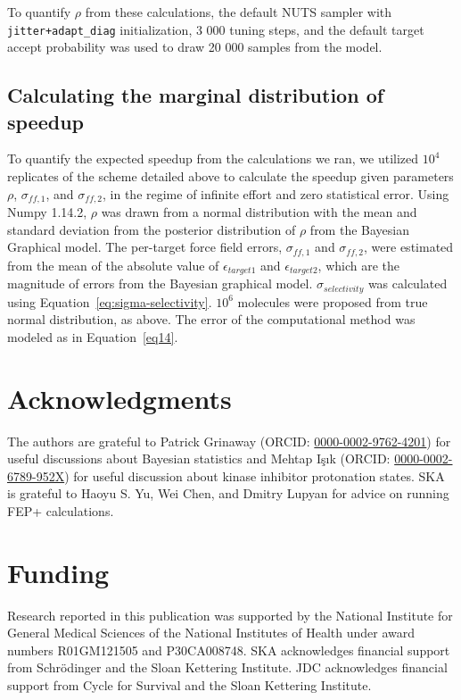\documentclass[phd,tocprelim]{cornell}
\begin{document}
To quantify $\rho$ from these calculations, the default NUTS sampler with {\tt jitter+adapt\_diag} initialization, 3 000 tuning steps, and the default target accept probability was used to draw 20 000 samples from the model. 

\subsection{Calculating the marginal distribution of speedup}

To quantify the expected speedup from the calculations we ran, we utilized $10^4$ replicates of the scheme detailed above to calculate the speedup given parameters $\rho$, $\sigma_{ff,1}$, and $\sigma_{ff,2}$, in the regime of infinite effort and zero statistical error. 
Using Numpy 1.14.2, $\rho$ was drawn from a normal distribution with the mean and standard deviation from the posterior distribution of $\rho$ from the Bayesian Graphical model. 
The per-target force field errors, $\sigma_{ff,1}$ and $\sigma_{ff,2}$, were estimated from the mean of the absolute value of  $\epsilon_{target1}$ and $\epsilon_{target2}$, which are the magnitude of errors from the Bayesian graphical model. $\sigma_{selectivity}$ was calculated using Equation~\ref{eq:sigma-selectivity}. 
$10^6$ molecules were proposed from true normal distribution, as above. 
The error of the computational method was modeled as in Equation~\ref{eq14}. 


\section{Acknowledgments}

The authors are grateful to Patrick Grinaway (ORCID: \href{http://orcid.org/0000-0002-9762-4201}{0000-0002-9762-4201}) for useful discussions about Bayesian statistics and Mehtap Işık (ORCID: \href{https://orcid.org/0000-0002-6789-952X}{0000-0002-6789-952X}) for useful discussion about kinase inhibitor protonation states. SKA is grateful to  Haoyu S. Yu, Wei Chen, and Dmitry Lupyan for advice on running FEP+ calculations. 


\section{Funding}

Research reported in this publication was supported by the National Institute for General Medical Sciences of the National Institutes of Health under award numbers R01GM121505 and P30CA008748.
SKA acknowledges financial support from Schr\"{o}dinger and the Sloan Kettering Institute.
JDC acknowledges financial support from Cycle for Survival and the Sloan Kettering Institute.
\end{document}
